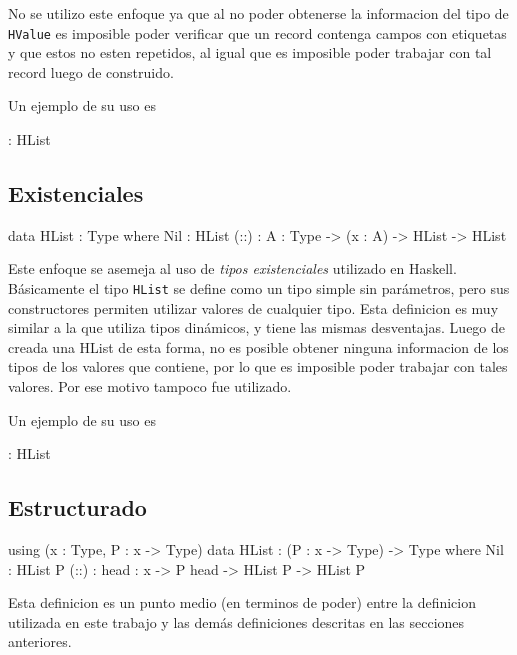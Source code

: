 No se utilizo este enfoque ya que al no poder obtenerse la informacion del tipo de \texttt{HValue} es imposible poder verificar que un record contenga campos con etiquetas y que estos no esten repetidos, al igual que es imposible poder trabajar con tal record luego de construido.

Un ejemplo de su uso es 

\begin{code}
 : HList
\end{code}

\subsection{Existenciales}

\begin{code}
data HList : Type where
    Nil : HList
    (::) : {A : Type} -> (x : A) -> HList -> HList
\end{code}

Este enfoque se asemeja al uso de \textit{tipos existenciales} utilizado en Haskell. Básicamente el tipo \texttt{HList} se define como un tipo simple sin parámetros, pero sus constructores permiten utilizar valores de cualquier tipo.
Esta definicion es muy similar a la que utiliza tipos dinámicos, y tiene las mismas desventajas. Luego de creada una HList de esta forma, no es posible obtener ninguna informacion de los tipos de los valores que contiene, por lo que es imposible poder trabajar con tales valores. Por ese motivo tampoco fue utilizado.

Un ejemplo de su uso es

\begin{code}
[1,"2"] : HList
\end{code}

\subsection{Estructurado}

\begin{code}
using (x : Type, P : x -> Type)        
    data HList : (P : x -> Type) ->  Type where
        Nil : HList P
        (::) : {head : x} -> P head -> HList P -> 
          HList P 
\end{code}

Esta definicion es un punto medio (en terminos de poder) entre la definicion utilizada en este trabajo y las demás definiciones descritas en las secciones anteriores.

